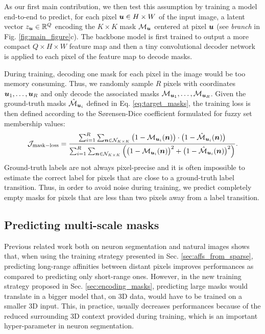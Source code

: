 As our first main contribution, we then test this assumption by training a model end-to-end to predict, for each pixel $\bm{u}\in H\times W$ of the input image, a latent vector $z_{\bm{u}}\in \mathbb{R}^Q$ encoding the $K \times K$ \maskname mask $\mathcal{M}_{\bm{u}}$ centered at pixel $\bm{u}$ (see \emph{\encBr branch} in Fig. \ref{fig:main_figure}c). 
The backbone model is first trained to output a more compact $Q\times H\times W$ feature map and
then a tiny convolutional decoder network is applied to each pixel of the feature map to decode masks.

During training, decoding one mask for each pixel in the image would be too memory consuming. Thus, we randomly sample $R$ pixels with coordinates $\bm{u}_1, \ldots, \bm{u}_R$ and only decode the associated masks $\mathcal{M}_{\bm{u}_1}, \ldots, \mathcal{M}_{\bm{u}_R}$. 
Given the ground-truth \maskname masks $\hat{\mathcal{M}}_{\bm{u}_i}$ defined in Eq. \ref{eq:target_masks}, the training loss is then defined according to the S\o rensen-Dice coefficient formulated for fuzzy set membership values:
\begin{equation}
\mathcal{J}_{\mathrm{mask-loss}} = \frac{\sum_{i=1}^R \sum_{\bm{n} \in \mathcal{N}_{K\times K}} \big(1-\mathcal{M}_{\bm{u}_i}(\bm{n})\big)\cdot \big(1-\hat{\mathcal{M}}_{\bm{u}_i}(\bm{n})\big)}{\sum_{i=1}^R \sum_{\bm{n}\in \mathcal{N}_{K\times K}} \Big( \big(1-\mathcal{M}_{\bm{u}_i}(\bm{n})\big)^2 + \big(1-\hat{\mathcal{M}}_{\bm{u}_i}(\bm{n})\big)^2 \Big)}.
\end{equation} 
Ground-truth labels are not always pixel-precise and it is often impossible to estimate the correct label for pixels that are close to a ground-truth label transition. Thus, in order to avoid noise during training, we predict completely empty masks for pixels that are less than two pixels away from a label transition. 


\subsection{Predicting multi-scale \maskname masks}\label{sec:multiscale_patches}
Previous related work both on neuron segmentation \cite{lee2017superhuman} and natural images \cite{liu2018affinity,Gao_2019_ICCV} shows that, when using the training strategy presented in Sec. \ref{sec:affs_from_sparse}, predicting long-range affinities between distant pixels improves performances as compared to predicting only short-range ones. However, in the new training strategy proposed in Sec. \ref{sec:encoding_masks}, predicting large \maskname masks would translate in a bigger model that, on 3D data, would have to be trained on a smaller 3D input.
This, in practice, usually decreases performances because of the reduced surrounding 3D context provided during training, which is an important hyper-parameter in neuron segmentation.


